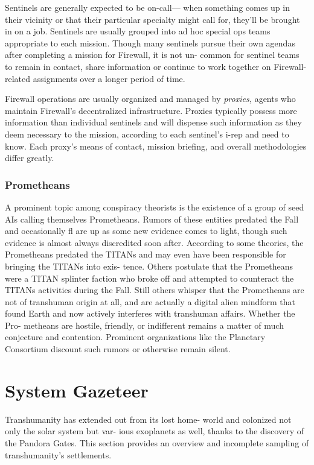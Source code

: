Sentinels are generally expected to be on-call—
when something comes up in their vicinity or that 
their particular specialty might call for, they'll be 
brought in on a job. Sentinels are usually grouped into 
ad hoc special ops teams appropriate to each mission. 
Though many sentinels pursue their own agendas 
after completing a mission for Firewall, it is not un-
common for sentinel teams to remain in contact, share 
information or continue to work together on Firewall-
related assignments over a longer period of time.

Firewall operations are usually organized and 
managed by \textit{proxies,} agents who maintain Firewall's 
decentralized infrastructure. Proxies typically possess 
more information than individual sentinels and will 
dispense such information as they deem necessary 
to the mission, according to each sentinel's i-rep and 
need to know. Each proxy's means of contact, mission 
briefing, and overall methodologies differ greatly.

\subsubsection{Prometheans}

A prominent topic among conspiracy theorists is the 
existence of a group of seed AIs calling themselves 
Prometheans. Rumors of these entities predated the 
Fall and occasionally fl are up as some new evidence 
comes to light, though such evidence is almost always 
discredited soon after. According to some theories, the 
Prometheans predated the TITANs and may even have 
been responsible for bringing the TITANs into exis-
tence. Others postulate that the Prometheans were a 
TITAN splinter faction who broke off and attempted 
to counteract the TITANs activities during the Fall. 
Still others whisper that the Prometheans are not of 
transhuman origin at all, and are actually a digital 
alien mindform that found Earth and now actively 
interferes with transhuman affairs. Whether the Pro-
metheans are hostile, friendly, or indifferent remains a 
matter of much conjecture and contention. Prominent 
organizations like the Planetary Consortium discount 
such rumors or otherwise remain silent.

\section{System Gazeteer}

Transhumanity has extended out from its lost home-
world and colonized not only the solar system but var-
ious exoplanets as well, thanks to the discovery of the 
Pandora Gates. This section provides an overview and 
incomplete sampling of transhumanity's settlements.

